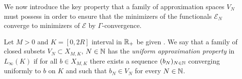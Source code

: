 




We now introduce the key property that a family of approximation spaces $V_N$ must possess in order to ensure that the minimizers of the functionals $\mathcal E_N$ converge to minimizers of $\mathcal E$ by $\Gamma$-convergence.

\begin{definition}\label{VNdef}
Let $M > 0$ and $K=[0,2R]$ interval in $\mathbb{R}_+$  be given . We say that a family of closed subsets $V_N \subset X_{M,K}$, $N \in \mathbb{N}$ has the \emph{uniform approximation property} in $L_{\infty}(K)$ if for all $b\in X_{M,K}$ there exists a sequence $(b_N)_{N \in \mathbb{N}}$ converging uniformly to $b$ on $K$ and such that $b_N\in V_N$ for every $N \in \mathbb{N}$.
\end{definition}

